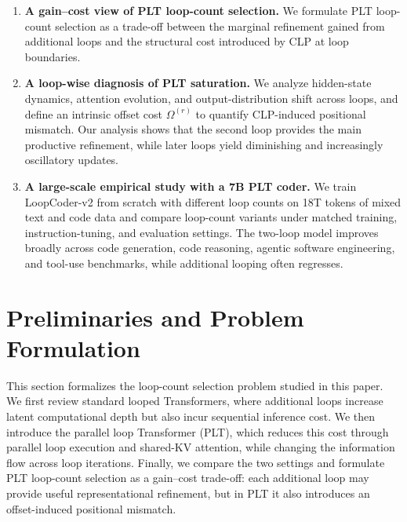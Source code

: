 \documentclass{llmxive}
\providecommand{\modelname}{LoopCoder-v2}
\begin{document}
\begin{enumerate}
\item \textbf{A gain--cost view of PLT loop-count selection.}
We formulate PLT loop-count selection as a trade-off between the marginal refinement gained from additional loops and the structural cost introduced by CLP at loop boundaries.

\item \textbf{A loop-wise diagnosis of PLT saturation.}
We analyze hidden-state dynamics, attention evolution, and output-distribution shift across loops, and define an intrinsic offset cost $\Omega^{(r)}$ to quantify CLP-induced positional mismatch. Our analysis shows that the second loop provides the main productive refinement, while later loops yield diminishing and increasingly oscillatory updates.

\item \textbf{A large-scale empirical study with a 7B PLT coder.}
We train \modelname{} from scratch with different loop counts on 18T tokens of mixed text and code data and compare loop-count variants under matched training, instruction-tuning, and evaluation settings. The two-loop model improves broadly across code generation, code reasoning, agentic software engineering, and tool-use benchmarks, while additional looping often regresses.
\end{enumerate}


\section{Preliminaries and Problem Formulation}
\label{sec:plt}
This section formalizes the loop-count selection problem studied in this paper. We first review standard looped Transformers, where additional loops increase latent computational depth but also incur sequential inference cost. We then introduce the parallel loop Transformer (PLT), which reduces this cost through parallel loop execution and shared-KV attention, while changing the information flow across loop iterations. Finally, we compare the two settings and formulate PLT loop-count selection as a gain--cost trade-off: each additional loop may provide useful representational refinement, but in PLT it also introduces an offset-induced positional mismatch.

\end{document}
